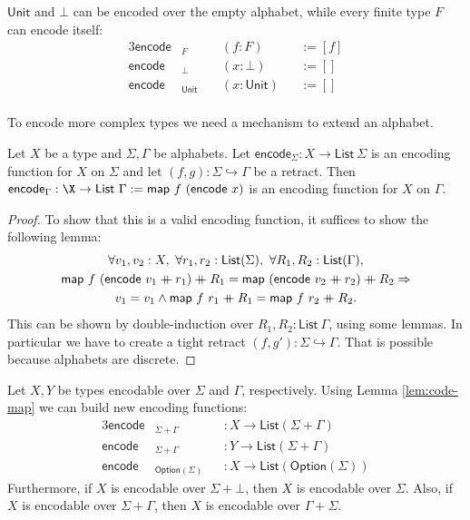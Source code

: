 \documentclass{psartcl}
\newcommand{\MS}[1]{\textsf{#1}}
\newcommand\mdoubleplus{\ensuremath{\mathbin{+\mkern-10mu+}}}
\newcommand{\app}{\mdoubleplus}
\newcommand{\from}{:}
\renewcommand{\to}{\rightarrow}
\newcommand{\Option}{\MS{Option}}
\newcommand{\Unit}{\MS{Unit}}
\newcommand{\List}{\MS{List}}
\newcommand{\Tau}{\Gamma}
\newcommand{\map}{\ensuremath{\MS{map}}}
\begin{document}
\begin{example}
  \label{ex:bacic-code}
  $\Unit$ and $\bot$ can be encoded over the empty alphabet, while every finite type $F$ can encode itself:
  \begin{alignat*}{3}
    \MS{encode}&_F    &&~(f:F)     &&:= [f] \\
    \MS{encode}&_\bot &&~(x:\bot)  &&:= [] \\
    \MS{encode}&_\Unit&&~(x:\Unit) &&:= [] \\
  \end{alignat*}
\end{example}

To encode more complex types we need a mechanism to extend an alphabet.
\begin{lemma}
  \label{lem:code-map}
  Let $X$ be a type and $\Sigma, \Tau$ be alphabets.
  Let $\MS{encode}_\Sigma \from X \to \List~\Sigma$ is an encoding function for $X$ on $\Sigma$ and
  let $(f,g) \from \Sigma \hookrightarrow \Tau$ be a retract.
  Then $\MS{encode}_\Tau \from \X \to \List~\Tau := \map~f~(\MS{encode}~x)$ is an encoding function for $X$ on $\Tau$.
\end{lemma}

\begin{proof}
  To show that this is a valid encoding function, it suffices to show the following lemma:
  \begin{multline*}
    \forall v_1,v_2:X,~\forall r_1, r_2:\List(\Sigma),~\forall R_1, R_2:\List(\Tau),\\
    \map~f~(\MS{encode}~v_1 \app r_1) \app R_1 = \map~(\MS{encode}~v_2 \app r_2) \app R_2 \Rightarrow \\
    v_1 = v_1 \land \map~f~r_1 \app R_1 = \map~f~r_2 \app R_2.
  \end{multline*}
  This can be shown by double-induction over $R_1, R_2:\List~\Tau$, using some lemmas.
  In particular we have to create a tight retract $(f, g') \from \Sigma \hookrightarrow \Tau$.
  That is possible because alphabets are discrete.
\end{proof}


\begin{corollary}
  \label{lem:extend-alphabet}
  Let $X, Y$ be types encodable over $\Sigma$ and $\Tau$, respectively.
  Using Lemma \ref{lem:code-map} we can build new encoding functions:
  \begin{alignat*}{3}
    \MS{encode}&_{\Sigma + \Tau}    &&\from X \to \List(\Sigma + \Tau) \\
    \MS{encode}&_{\Sigma + \Tau}    &&\from Y \to \List(\Sigma + \Tau) \\
    \MS{encode}&_{\Option(\Sigma)}  &&\from X \to \List(\Option(\Sigma))
  \end{alignat*}
  Furthermore, if $X$ is encodable over $\Sigma+\bot$, then $X$ is encodable over $\Sigma$.
  Also, if $X$ is encodable over $\Sigma+\Tau$, then $X$ is encodable over $\Tau+\Sigma$.
\end{corollary}
\end{document}
